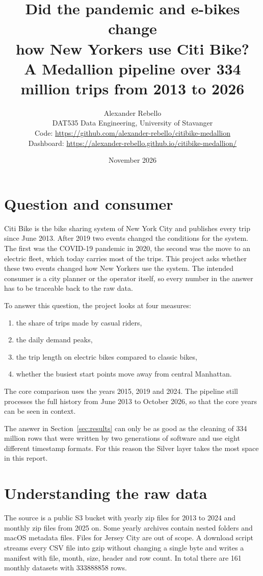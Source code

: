 \documentclass[11pt,a4paper]{article}
\title{Did the pandemic and e-bikes change\\ how New Yorkers use Citi Bike?\\[4pt]
\large A Medallion pipeline over 334 million trips from 2013 to 2026}
\author{Alexander Rebello \\ DAT535 Data Engineering, University of Stavanger \\[10pt]
\small Code: \url{https://github.com/alexander-rebello/citibike-medallion} \\
\small Dashboard: \url{https://alexander-rebello.github.io/citibike-medallion/}}
\date{November 2026}
\begin{document}
\maketitle

\section{Question and consumer}

Citi Bike is the bike sharing system of New York City and publishes every trip since June 2013. After 2019 two events
changed the conditions for the system. The first was the COVID-19 pandemic in 2020, the second was the move to an electric
fleet, which today carries most of the trips. This project asks whether these two events changed how New Yorkers use the
system. The intended consumer is a city planner or the operator itself, so every number in the answer has to be traceable
back to the raw data.

To answer this question, the project looks at four measures:
\begin{enumerate}
\item the share of trips made by casual riders,
\item the daily demand peaks,
\item the trip length on electric bikes compared to classic bikes,
\item whether the busiest start points move away from central Manhattan.
\end{enumerate}
The core comparison uses the years 2015, 2019 and 2024. The pipeline still processes the full history from June 2013 to
October 2026, so that the core years can be seen in context.

The answer in Section~\ref{sec:results} can only be as good as the cleaning of 334 million rows that were written by two
generations of software and use eight different timestamp formats. For this reason the Silver layer takes the most space
in this report.

\newpage
\section{Understanding the raw data}
\label{sec:data}

The source is a public S3 bucket with yearly zip files for 2013 to 2024 and monthly zip files from 2025 on. Some yearly
archives contain nested folders and macOS metadata files. Files for Jersey City are out of scope. A download script streams
every CSV file into gzip without changing a single byte and writes a manifest with file, month, size, header and row count.
In total there are 161 monthly datasets with \num{333888858} rows.
\end{document}
